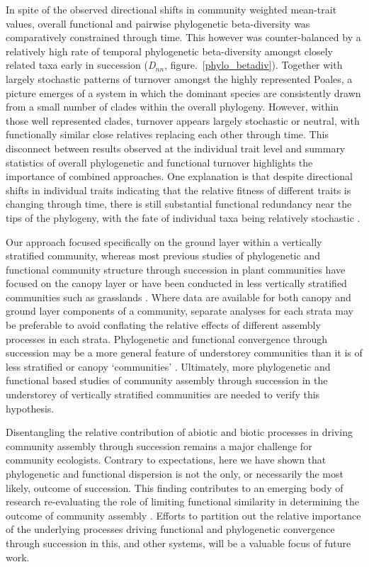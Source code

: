 In spite of the observed directional shifts in community weighted mean-trait values, overall functional and pairwise phylogenetic beta-diversity was comparatively constrained through time. This however was counter-balanced by a relatively high rate of temporal phylogenetic beta-diversity amongst closely related taxa early in succession (\textit{D}$_{nn}$, figure.~\ref{phylo_betadiv}). Together with largely stochastic patterns of turnover amongst the highly represented Poales, a picture emerges of a system in which the dominant species are consistently drawn from a small number of clades within the overall phylogeny. However, within those well represented clades, turnover appears largely stochastic or neutral, with functionally similar close relatives replacing each other through time. This disconnect between results observed at the individual trait level and summary statistics of overall phylogenetic and functional turnover highlights the importance of combined approaches. One explanation is that despite directional shifts in individual traits indicating that the relative fitness of different traits is changing through time, there is still substantial functional redundancy near the tips of the phylogeny, with the fate of individual taxa being relatively stochastic \citep{Rosenfeld2002}.      

Our approach focused specifically on the ground layer within a vertically stratified community, whereas most previous studies of phylogenetic and functional community structure through succession in plant communities have focused on the canopy layer \citep[e.g.][]{Letcher2010,Norden2012} or have been conducted in less vertically stratified communities such as grasslands \citep[e.g.][]{Purschke2013}. Where data are available for both canopy and ground layer components of a community, separate analyses for each strata may be preferable to avoid conflating the relative effects of different assembly processes in each strata. Phylogenetic and functional convergence through succession may be a more general feature of understorey communities than it is of less stratified or canopy `communities' \citep[but see][for an example of convergence amongst canopy species in temperate forests]{Kunstler2012}. Ultimately, more phylogenetic and functional based studies of community assembly through succession in the understorey of vertically stratified communities are needed to verify this hypothesis.

Disentangling the relative contribution of abiotic and biotic processes in driving community assembly through succession remains a major challenge for community ecologists. Contrary to expectations, here we have shown that phylogenetic and functional dispersion is not the only, or necessarily the most likely, outcome of succession. This finding contributes to an emerging body of research re-evaluating the role of limiting functional similarity in determining the outcome of community assembly \citep{Mayfield2010,Kunstler2012, Price2013, Bennett2013}. Efforts to partition out the relative importance of the underlying processes driving functional and phylogenetic convergence through succession in this, and other systems, will be a valuable focus of future work.

